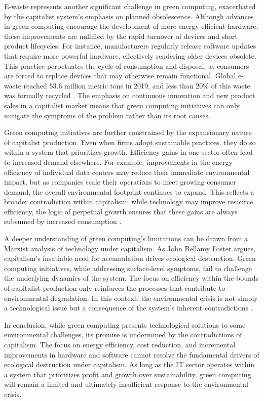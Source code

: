 E-waste represents another significant challenge in green computing, exacerbated by the capitalist system’s emphasis on planned obsolescence. Although advances in green computing encourage the development of more energy-efficient hardware, these improvements are nullified by the rapid turnover of devices and short product lifecycles. For instance, manufacturers regularly release software updates that require more powerful hardware, effectively rendering older devices obsolete. This practice perpetuates the cycle of consumption and disposal, as consumers are forced to replace devices that may otherwise remain functional. Global e-waste reached 53.6 million metric tons in 2019, and less than 20\% of this waste was formally recycled \cite[pp.~2-4]{forti2020global}. The emphasis on continuous innovation and new product sales in a capitalist market means that green computing initiatives can only mitigate the symptoms of the problem rather than its root causes.

Green computing initiatives are further constrained by the expansionary nature of capitalist production. Even when firms adopt sustainable practices, they do so within a system that prioritizes growth. Efficiency gains in one sector often lead to increased demand elsewhere. For example, improvements in the energy efficiency of individual data centers may reduce their immediate environmental impact, but as companies scale their operations to meet growing consumer demand, the overall environmental footprint continues to expand. This reflects a broader contradiction within capitalism: while technology may improve resource efficiency, the logic of perpetual growth ensures that these gains are always subsumed by increased consumption \cite[pp.~84-87]{foster2000ecology}.

A deeper understanding of green computing’s limitations can be drawn from a Marxist analysis of technology under capitalism. As John Bellamy Foster argues, capitalism’s insatiable need for accumulation drives ecological destruction. Green computing initiatives, while addressing surface-level symptoms, fail to challenge the underlying dynamics of the system. The focus on efficiency within the bounds of capitalist production only reinforces the processes that contribute to environmental degradation. In this context, the environmental crisis is not simply a technological issue but a consequence of the system’s inherent contradictions \cite[pp.~34-37]{foster2000ecology}.

In conclusion, while green computing presents technological solutions to some environmental challenges, its promise is undermined by the contradictions of capitalism. The focus on energy efficiency, cost reduction, and incremental improvements in hardware and software cannot resolve the fundamental drivers of ecological destruction under capitalism. As long as the IT sector operates within a system that prioritizes profit and growth over sustainability, green computing will remain a limited and ultimately insufficient response to the environmental crisis.

